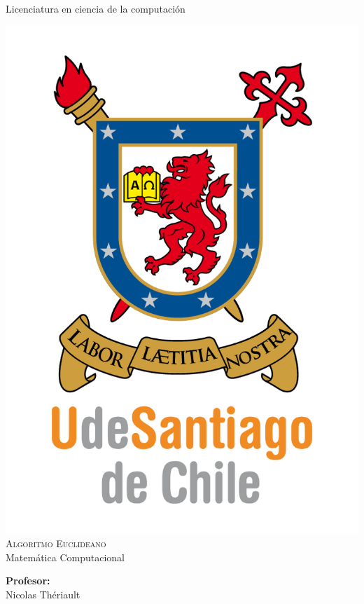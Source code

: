 \documentclass[12pt,letterpaper]{scrartcl}
\author{Don cuyi}
\begin{document}
\begin{titlepage}

	\begin{center}

		{\Large { Licenciatura en ciencia de la computación} }

		\includegraphics[scale=1]{UDSCNRJ}
		\\[1cm]

		{\Huge \textsc{Algoritmo Euclideano}}\\[0.7cm]

		{\huge  Matemática Computacional}\\[2cm]


		\begin{minipage}[l]{0.4\textwidth}
			\begin{flushleft}
				\linespread{1}
				\textbf{\textsf{Profesor:}}\\
				\large Nicolas Thériault
			\end{flushleft}
		\end{minipage}
		\begin{minipage}[l]{0.4\textwidth}


\end{minipage}
\end{center}
\end{titlepage}
\end{document}
